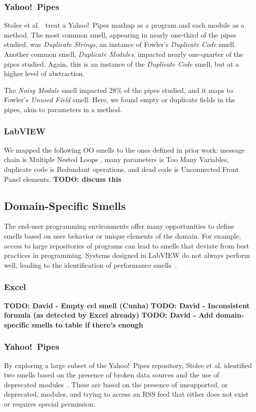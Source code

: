 \documentclass[10pt,conference,compsocconf]{IEEEtran}
\newcommand{\todo}[1]{\textbf{TODO: #1}}
\begin{document}
\subsubsection{Yahoo!\ Pipes}
Stolee et al.~\cite{Stolee2011, StoleeTSE2013} treat a Yahoo!\ Pipes mashup as a program and each module as a method.  The most common smell, appearing in nearly one-third of the pipes studied, was \emph{Duplicate Strings}, an instance of Fowler's \emph{Duplicate Code} smell. 
Another common smell, \emph{Duplicate Modules}, impacted nearly one-quarter of the pipes studied. Again, this is an instance of the \emph{Duplicate Code} smell, but at a higher level of abstraction. 

The \emph{Noisy Module} smell impacted 28\% of the pipes studied, and it maps to Fowler's \emph{Unused Field} smell. Here, we found empty or duplicate fields in the pipes, akin to parameters in a method. 

\subsubsection{LabVIEW}

We mapped the following OO smells to the ones defined in prior work\cite{chambers2013smell}: message chain is Multiple Nested Loops , many parameters is Too Many Variables, duplicate code is Redundant operations, and dead code is Unconnected Front Panel
elements. 
\todo{discuss this}

\subsection{Domain-Specific Smells}
The end-user programming environments offer many opportunities to define smells based on user behavior or unique elements of the domain. For example, access to large repositories of programs can lead to smells that deviate from best practices in programming. Systems designed in LabVIEW do not always perform well, leading to the identification of performance smells~\cite{chambers2013smell}. 

\subsubsection{Excel}

\todo{David - Empty cel smell (Cunha)}
\todo{David - Inconsistent formula (as detected by Excel already)}
\todo{David - Add domain-specific smells to table if there's enough}

\subsubsection{Yahoo!\ Pipes}
By exploring a large subset of the Yahoo!\ Pipes repository, Stolee et al. identified two smells based on the presence of broken data sources and the use of deprecated modules~\cite{StoleeTSE2013}. These are based on the presence of unsupported, or deprecated, modules, and trying to access an RSS feed that either does not exist or requires special permission. 
\end{document}
